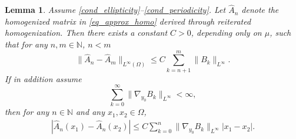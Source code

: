 \documentclass[reqno,12pt]{amsart} %
\newtheorem{lemma}[theorem]{Lemma}
\theoremstyle{definition}
\theoremstyle{remark}
\numberwithin{equation}{section}
\newcommand{\N}{\mathbb{N}}
\begin{document}
\begin{lemma}\label{qual-homog_lem_difference}
    Assume \eqref{cond_ellipticity}--\eqref{cond_periodicity}.
    Let $\widehat{A}_n$ denote the homogenized matrix in \eqref{eq_approx_homo} derived through reiterated homogenization. Then there exists a constant $C>0$, depending only on $\mu$, such that for any $n,m \in \N$, $n< m$
    \begin{equation}\label{est.hatAn-Am}
        \|\widehat{A}_n- \widehat{A}_m\|_{L^\infty(\Omega)} \le C \sum_{k=n+1}^m \|B_k\|_{L^\infty}.
     \end{equation}
    If in addition assume
    \begin{equation}\label{cond_Dy0B}
        \sum_{k=0}^\infty\|\nabla_{y_0}B_k\|_{L^\infty}<\infty,
    \end{equation}
    then for any $n\in\mathbb{N}$ and any $x_1, x_2\in \Omega$,
    \begin{align}\label{est.hatAn-Lip}
        |\widehat{A}_n(x_1)-\widehat{A}_n(x_2)|\leq C\sum_{k=0}^n\|\nabla_{y_0}B_k\|_{L^\infty}|x_1-x_2|. 
    \end{align}
\end{lemma}
\end{document}

